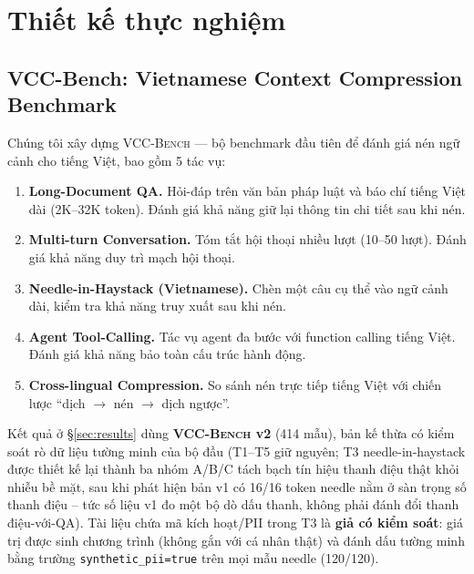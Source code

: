 \documentclass[12pt,a4paper]{article}
\newcommand{\method}[1]{\textsc{#1}}         %
\begin{document}
\section{Thiết kế thực nghiệm}

\subsection{VCC-Bench: Vietnamese Context Compression Benchmark}

Chúng tôi xây dựng \method{VCC-Bench} --- bộ benchmark đầu tiên để đánh giá nén ngữ cảnh cho tiếng Việt, bao gồm 5 tác vụ:

\begin{enumerate}[label=\textbf{T\arabic*}:,leftmargin=*]
    \item \textbf{Long-Document QA.} Hỏi-đáp trên văn bản pháp luật và báo chí tiếng Việt dài (2K--32K token). Đánh giá khả năng giữ lại thông tin chi tiết sau khi nén.
    \item \textbf{Multi-turn Conversation.} Tóm tắt hội thoại nhiều lượt (10--50 lượt). Đánh giá khả năng duy trì mạch hội thoại.
    \item \textbf{Needle-in-Haystack (Vietnamese).} Chèn một câu cụ thể vào ngữ cảnh dài, kiểm tra khả năng truy xuất sau khi nén.
    \item \textbf{Agent Tool-Calling.} Tác vụ agent đa bước với function calling tiếng Việt. Đánh giá khả năng bảo toàn cấu trúc hành động.
    \item \textbf{Cross-lingual Compression.} So sánh nén trực tiếp tiếng Việt với chiến lược ``dịch $\to$ nén $\to$ dịch ngược''.
\end{enumerate}

Kết quả ở \S\ref{sec:results} dùng \textbf{\method{VCC-Bench} v2} (414 mẫu), bản kế thừa có kiểm soát rò dữ liệu tường minh của bộ đầu (T1--T5 giữ nguyên; T3 needle-in-haystack được thiết kế lại thành ba nhóm A/B/C tách bạch tín hiệu thanh điệu thật khỏi nhiễu bề mặt, sau khi phát hiện bản v1 có 16/16 token needle nằm ở sàn trọng số thanh điệu -- tức số liệu v1 đo một bộ dò dấu thanh, không phải đánh đổi thanh điệu-với-QA). Tài liệu chứa mã kích hoạt/PII trong T3 là \textbf{giả có kiểm soát}: giá trị được sinh chương trình (không gắn với cá nhân thật) và đánh dấu tường minh bằng trường \texttt{synthetic\_pii=true} trên mọi mẫu needle (120/120).
\end{document}
